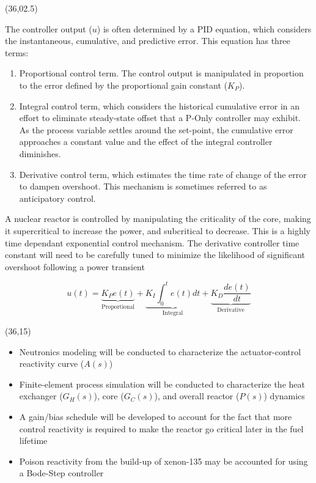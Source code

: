 \documentclass{article}
\def\CHead#1{\begin{center}\noindent{\LARGE\color{DarkBlue} #1}\end{center}}
\renewcommand{\LARGE}{\fontsize{43}{54}\selectfont}
\begin{document}
\begin{textblock}{10}(36,02.5)
\CHead{PID Controller}
The controller output ($u$) is often determined by a PID equation, which considers the instantaneous, cumulative, and predictive error. This equation has three terms:
\begin{enumerate}
\item Proportional control term. The control output is manipulated in proportion to the error defined by the proportional gain constant ($K_P$).   
\item Integral control term, which considers the historical cumulative error in an effort to eliminate steady-state offset that a P-Only controller may exhibit. As the process variable settles around the set-point, the cumulative error approaches a constant value and the effect of the integral controller diminishes.
\item Derivative control term, which estimates the time rate of change of the error to dampen overshoot. This mechanism is sometimes referred to as anticipatory control. 
\end{enumerate}

A nuclear reactor is controlled by manipulating the criticality of the core, making it supercritical to increase the power, and subcritical to decrease. This is a highly time dependant exponential control mechanism. The derivative controller time constant will need to be carefully tuned to minimize the likelihood of significant overshoot following a power transient


\begin{equation*}\label{eqn:pid}
    u(t) 
    = \underbrace{K_P e(t)}_{\text{Proportional}} 
    + \underbrace{K_I \int_0^t e(t)dt}_{\text{Integral}} 
    + \underbrace{K_D \frac{de(t)}{dt}}_{\text{Derivative}}
\end{equation*}
\end{textblock}


\begin{textblock}{10}(36,15)
\CHead{Future Work}
\begin{itemize}
    \item Neutronics modeling will be conducted to characterize the actuator-control reactivity curve ($A(s)$)
    \item Finite-element process simulation will be conducted to characterize the heat exchanger ($G_H(s)$), core ($G_C(s)$), and overall reactor ($P(s)$) dynamics
    \item A gain/bias schedule will be developed to account for the fact that more control reactivity is required to make the reactor go critical later in the fuel lifetime
    \item Poison reactivity from the build-up of xenon-135 may be accounted for using a Bode-Step controller \cite{Roberson}
\end{itemize}



\end{textblock}
\end{document}
